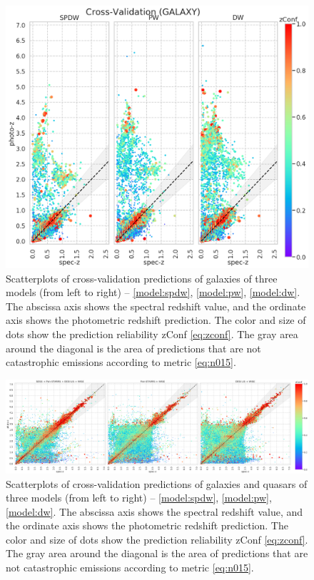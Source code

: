 \documentclass[fleqn,usenatbib]{mnras}
\begin{document}
\begin{figure}
    \centering
    \includegraphics[width=0.9\linewidth]{images/scatterplots-cv2-gal.png}
    \caption{Scatterplots of cross-validation predictions of galaxies of three models (from left to right) -- \ref{model:spdw}, \ref{model:pw}, \ref{model:dw}. The abscissa axis shows the spectral redshift value, and the ordinate axis shows the photometric redshift prediction. The color and size of dots show the prediction reliability zConf \eqref{eq:zconf}. The gray area around the diagonal is the area of predictions that are not catastrophic emissions according to metric \eqref{eq:n015}.}
    \label{fig:metrics-cv2-gal}
\end{figure}

\begin{figure}
    \centering
    \includegraphics[width=0.9\linewidth]{images/scatterplots-cv2-total.png}
    \caption{Scatterplots of cross-validation predictions of galaxies and quasars of three models (from left to right) -- \ref{model:spdw}, \ref{model:pw}, \ref{model:dw}. The abscissa axis shows the spectral redshift value, and the ordinate axis shows the photometric redshift prediction. The color and size of dots show the prediction reliability zConf \eqref{eq:zconf}. The gray area around the diagonal is the area of predictions that are not catastrophic emissions according to metric \eqref{eq:n015}.}
    \label{fig:my_label}
\end{figure}
\end{document}
